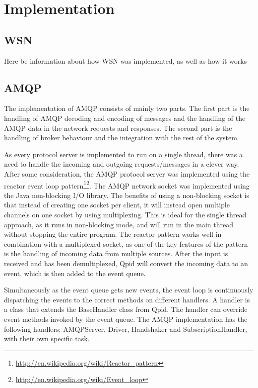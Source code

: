 \section{Implementation}
\label{sec:architecture_and_implementation-implementation}

\subsection{WSN}
\label{subsec:architecture_and_implementation-implementation-wsn}

Here be information about how WSN was implemented, as well as how it works

\subsection{AMQP}
\label{subsec:architecture_and_implementation-implementation-amqp}
The implementation of AMQP consists of mainly two parts. The first part is the handling of AMQP decoding and encoding of messages and the handling of the AMQP data in the network requests and responses. The second part is the handling of broker behaviour and the integration with the rest of the system. 

As every protocol server is implemented to run on a single thread, there was a need to handle the incoming and outgoing requests/messages in a clever way. After some consideration, the AMQP protocol server was implemented using the reactor event loop pattern\footnote{\url{http://en.wikipedia.org/wiki/Reactor_pattern}}\footnote{\url{http://en.wikipedia.org/wiki/Event_loop}}. 
The AMQP network socket was implemented using the Java non-blocking I/O library. The benefits of using a non-blocking socket is that instead of creating one socket per client, it will instead open multiple channels on one socket by using multiplexing. This is ideal for the single thread approach, as it runs in non-blocking mode, and will run in the main thread without stopping the entire program. The reactor pattern works well in combination with a multiplexed socket, as one of the key features of the pattern is the handling of incoming data from multiple sources. After the input is received and has been demultiplexed, Qpid will convert the incoming data to an event, which is then added to the event queue.

Simultaneously as the event queue gets new events, the event loop is continuously dispatching the events to the correct methods on different handlers. A handler is a class that extends the BaseHandler class from Qpid. The handler can override event methods invoked by the event queue. The AMQP implementation has the following handlers; AMQPServer, Driver, Handshaker and SubscriptionHandler, with their own specific task.

